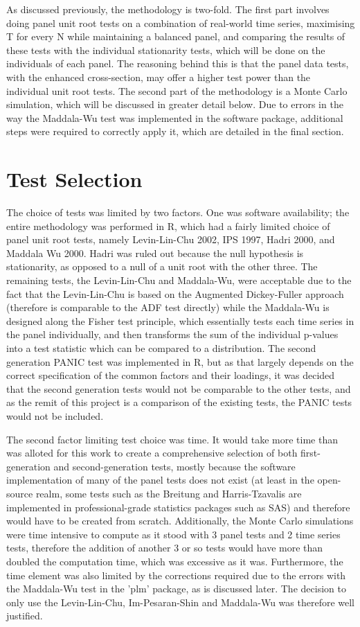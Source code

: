 As discussed previously, the methodology is two-fold. The first part involves doing panel unit root tests on a combination of real-world time series, maximising T for every N while maintaining a balanced panel, and comparing the results of these tests with the individual stationarity tests, which will be done on the individuals of each panel. The reasoning behind this is that the panel data tests, with the enhanced cross-section, may offer a higher test power than the individual unit root tests. The second part of the methodology is a Monte Carlo simulation, which will be discussed in greater detail below. Due to errors in the way the Maddala-Wu test was implemented in the software package, additional steps were required to correctly apply it, which are detailed in the final section.

\section{Test Selection}

The choice of tests was limited by two factors. One was software availability; the entire methodology was performed in R, which had a fairly limited choice of panel unit root tests, namely Levin-Lin-Chu 2002, IPS 1997, Hadri 2000, and Maddala Wu 2000. Hadri was ruled out because the null hypothesis is stationarity, as opposed to a null of a unit root with the other three. The remaining tests, the Levin-Lin-Chu and Maddala-Wu, were acceptable due to the fact that the Levin-Lin-Chu is based on the Augmented Dickey-Fuller \citep{said1984testing} approach (therefore is comparable to the ADF test directly) while the Maddala-Wu is designed along the Fisher test principle, which essentially tests each time series in the panel individually, and then transforms the sum of the individual p-values into a test statistic which can be compared to a distribution. The second generation PANIC test was implemented in R, but as that largely depends on the correct specification of the common factors and their loadings, it was decided that the second generation tests would not be comparable to the other tests, and as the remit of this project is a comparison of the existing tests, the PANIC tests would not be included.

The second factor limiting test choice was time. It would take more time than was alloted for this work to create a comprehensive selection of both first-generation and second-generation tests, mostly because the software implementation of many of the panel tests does not exist (at least in the open-source realm, some tests such as the Breitung and Harris-Tzavalis are implemented in professional-grade statistics packages such as SAS) and therefore would have to be created from scratch. Additionally, the Monte Carlo simulations were time intensive to compute as it stood with 3 panel tests and 2 time series tests, therefore the addition of another 3 or so tests would have more than doubled the computation time, which was excessive as it was. Furthermore, the time element was also limited by the corrections required due to the errors with the Maddala-Wu test in the 'plm' package, as is discussed later. The decision to only use the Levin-Lin-Chu, Im-Pesaran-Shin and Maddala-Wu was therefore well justified.


